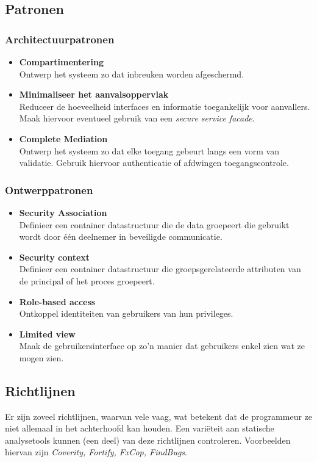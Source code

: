 \documentclass[../main.tex]{subfiles}
\begin{document}
\subsection{Patronen}
\subsubsection{Architectuurpatronen}
\begin{itemize}
	\item \textbf{Compartimentering} \\ Ontwerp het systeem zo dat inbreuken worden afgeschermd.
	\item \textbf{Minimaliseer het aanvalsoppervlak} \\ Reduceer de hoeveelheid interfaces en informatie toegankelijk voor aanvallers. Maak hiervoor eventueel gebruik van een \textit{secure service facade}.
	\item \textbf{Complete Mediation} \\ Ontwerp het systeem zo dat elke toegang gebeurt langs een vorm van validatie. Gebruik hiervoor authenticatie of afdwingen toegangscontrole.
\end{itemize}

\subsubsection{Ontwerppatronen}
\begin{itemize}
	\item \textbf{Security Association} \\
	Definieer een container datastructuur die de data groepeert die gebruikt wordt door \'e\'en deelnemer in beveiligde communicatie.
	\item \textbf{Security context} \\
	Definieer een container datastructuur die groepsgerelateerde attributen van de principal of het proces groepeert.
	\item \textbf{Role-based access} \\
	Ontkoppel identiteiten van gebruikers van hun privileges.
	\item \textbf{Limited view} \\
	Maak de gebruikersinterface op zo'n manier dat gebruikers enkel zien wat ze mogen zien.
\end{itemize}

\subsection{Richtlijnen}
Er zijn zoveel richtlijnen, waarvan vele vaag, wat betekent dat de programmeur ze niet allemaal in het achterhoofd kan houden. Een vari\"eteit aan statische analysetools kunnen (een deel) van deze richtlijnen controleren. Voorbeelden hiervan zijn \textit{Coverity, Fortify, FxCop, FindBugs}.
\end{document}
